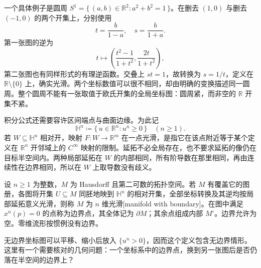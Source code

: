 \ProseParagraphBreak

一个具体例子是圆周 \(S^1=\{\,(a,b)\in\mathbb R^2:a^2+b^2=1\,\}\)。在删去 \((1,0)\) 与删去 \((-1,0)\) 的两个开集上，分别使用
\[
 t=\frac{b}{1-a},\quad s=\frac{b}{1+a}.
\]
第一张图的逆为
\[
 t\longmapsto
 \left(\frac{t^2-1}{1+t^2},\frac{2t}{1+t^2}\right),
\]
第二张图也有同样形式的有理逆函数。交叠上 \(st=1\)，故转换为 \(s=1/t\)，定义在 \(\mathbb R\setminus\{0\}\) 上，确实光滑。两个坐标数值可以很不相同，却由明确的变换描述同一圆周。整个圆周不能有一张取值于欧氏开集的全局坐标图：圆周紧，而非空的 \(\mathbb R\) 开集不紧。

\ProseParagraphBreak

积分公式还需要容许区间端点与曲面边缘。为此记
\[
 \mathbb H^n\coloneqq\{\,u\in\mathbb R^n:u^n\geq0\,\}
 \quad(n\geq1).
\]
若 \(W\subseteq\mathbb H^n\) 相对开，映射 \(F:W\rightarrow\mathbb R^m\) 在一点光滑，是指它在该点附近等于某个定义在 \(\mathbb R^n\) 开邻域上的 \(C^\infty\) 映射的限制。延拓不必全局存在，也不要求延拓的像仍在目标半空间内。两种局部延拓在 \(W\) 的内部相同，所有阶导数在那里相同，再由连续性在边界相同，所以在 \(W\) 上取导数没有歧义。

\begin{definition}[带边界流形]\label{b1:def:E-manifold-boundary}
设 \(n\geq1\) 为整数，\(M\) 为 Hausdorff 且第二可数的拓扑空间。若 \(M\) 有覆盖它的图册，各图将开集 \(U\subseteq M\) 同胚地映到 \(\mathbb H^n\) 的相对开集，全部坐标转换及其逆均按局部延拓意义光滑，则称 \(M\) 为 \(n\) 维光滑[manifold with boundary]。在图中满足 \(x^n(p)=0\) 的点称为边界点，其全体记为 \(\partial M\)；其余点组成内部 \(M^\circ\)。边界允许为空。零维流形按惯例没有边界。
\end{definition}

无边界坐标图可以平移、缩小后放入 \(\{u^n>0\}\)，因而这个定义包含无边界情形。这里有一个需要核对的几何问题：一个坐标系中的边界点，换到另一张图后是否仍落在半空间的边界上？

